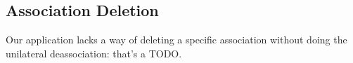 \subsection{Association Deletion}
Our application lacks a way of deleting a specific association without doing the unilateral deassociation: that's a TODO.
